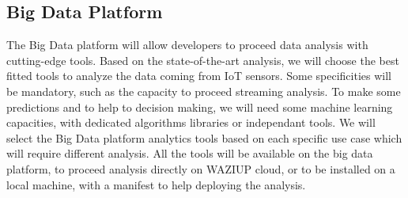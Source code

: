 \subsection{Big Data Platform}

The Big Data platform will allow developers to proceed data analysis with cutting-edge tools. 
Based on the state-of-the-art analysis, we will choose the best fitted tools to analyze the data coming from IoT sensors. 
Some specificities will be mandatory, such as the capacity to proceed streaming analysis. 
To make some predictions and to help to decision making, we will need some machine learning capacities, with dedicated algorithms libraries or independant tools.
We will select the Big Data platform analytics tools based on each specific use case which will require different analysis. 
All the tools will be available on the big data platform, to proceed analysis directly on WAZIUP cloud, or to be installed on a local machine, with a manifest to help deploying the analysis.




